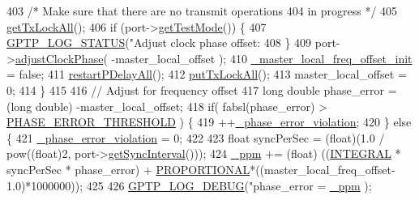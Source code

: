 \begin{DoxyCode}
{403             \textcolor{comment}{/* Make sure that there are no transmit operations}
404 \textcolor{comment}{               in progress */}
405             \hyperlink{class_i_e_e_e1588_clock_a98af15e13aebb9119b092516f0bc0a92}{getTxLockAll}();
406             \textcolor{keywordflow}{if} (port->\hyperlink{class_common_port_a98f6d8a0054a05b8e627d3f9ffc53be3}{getTestMode}()) \{
407                 \hyperlink{gptp__log_8hpp_a9bcf107d6f77d335b92bbc4825ea85a3}{GPTP\_LOG\_STATUS}(\textcolor{stringliteral}{"Adjust clock phase offset:%
408             \}
409             port->\hyperlink{class_common_port_a02450dd64ba11f034faefad018d15a63}{adjustClockPhase}( -master\_local\_offset );
410             \hyperlink{class_i_e_e_e1588_clock_abca95b219ee50066ce65ca36310c3aa3}{\_master\_local\_freq\_offset\_init} = \textcolor{keyword}{false};
411             \hyperlink{class_i_e_e_e1588_clock_a4ada94f8f399ab8c4a1161cc2ec5aa65}{restartPDelayAll}();
412             \hyperlink{class_i_e_e_e1588_clock_aa3aa708f764cf6be40a020f8092eed59}{putTxLockAll}();
413             master\_local\_offset = 0;
414         \}
415 
416         \textcolor{comment}{// Adjust for frequency offset}
417         \textcolor{keywordtype}{long} \textcolor{keywordtype}{double} phase\_error = (\textcolor{keywordtype}{long} double) -master\_local\_offset;
418         \textcolor{keywordflow}{if}( fabsl(phase\_error) > \hyperlink{avbts__clock_8hpp_a632fcbcb4918a77ecb4e6dab13c07f08}{PHASE\_ERROR\_THRESHOLD} ) \{
419             ++\hyperlink{class_i_e_e_e1588_clock_a25a69327f1634dd59c4bee36a4d3007b}{\_phase\_error\_violation};
420         \} \textcolor{keywordflow}{else} \{
421             \hyperlink{class_i_e_e_e1588_clock_a25a69327f1634dd59c4bee36a4d3007b}{\_phase\_error\_violation} = 0;
422 
423             \textcolor{keywordtype}{float} syncPerSec = (float)(1.0 / pow((\textcolor{keywordtype}{float})2, port->\hyperlink{class_common_port_a963da67f8dd0b8c72bd19ca91c3ce00d}{getSyncInterval}()));
424             \hyperlink{class_i_e_e_e1588_clock_ae061efd6b04ce63dbc4c48b9bb1d3002}{\_ppm} += (float) ((\hyperlink{avbts__clock_8hpp_a3f0ce7c5c78635d0dfe2b67af17bd4e5}{INTEGRAL} * syncPerSec * phase\_error) + 
      \hyperlink{avbts__clock_8hpp_a63c16fd0a5b056621620d8c18be1a871}{PROPORTIONAL}*((master\_local\_freq\_offset-1.0)*1000000));
425 
426             \hyperlink{gptp__log_8hpp_ae4c6efe7c9cf6d7d3bbd28a0fd087d61}{GPTP\_LOG\_DEBUG}(\textcolor{stringliteral}{"phase\_error = %
      \hyperlink{class_i_e_e_e1588_clock_ae061efd6b04ce63dbc4c48b9bb1d3002}{\_ppm} );
}}}
\end{DoxyCode}
